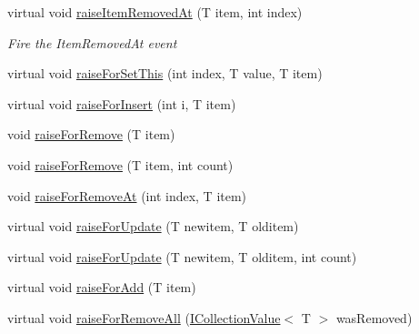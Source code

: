 \begin{DoxyCompactItemize}
virtual void \hyperlink{class_c5_1_1_collection_value_base_a510a21c57e543cadb4ce4748b9099679}{raise\+Item\+Removed\+At} (T item, int index)
\begin{DoxyCompactList}\small\item\em Fire the Item\+Removed\+At event \end{DoxyCompactList}\item 
virtual void \hyperlink{class_c5_1_1_collection_value_base_a14876a0f26a0741ff82f3d851caa4602}{raise\+For\+Set\+This} (int index, T value, T item)
\item 
virtual void \hyperlink{class_c5_1_1_collection_value_base_a1f7ef395f3ad8027a2b32916a181b418}{raise\+For\+Insert} (int i, T item)
\item 
void \hyperlink{class_c5_1_1_collection_value_base_a2e014b2904d9ef88d3e15f6b0997f71b}{raise\+For\+Remove} (T item)
\item 
void \hyperlink{class_c5_1_1_collection_value_base_a95fcc3b52892d362b6118f57a8906cb8}{raise\+For\+Remove} (T item, int count)
\item 
void \hyperlink{class_c5_1_1_collection_value_base_ae15fee0551df68fa0e163604f920d601}{raise\+For\+Remove\+At} (int index, T item)
\item 
virtual void \hyperlink{class_c5_1_1_collection_value_base_ad76dc5138c43e80dd057007d78bb374d}{raise\+For\+Update} (T newitem, T olditem)
\item 
virtual void \hyperlink{class_c5_1_1_collection_value_base_ad05d49b820265d7e4e73c4f5992596b9}{raise\+For\+Update} (T newitem, T olditem, int count)
\item 
virtual void \hyperlink{class_c5_1_1_collection_value_base_a1048affd98d865d07454bcea754ec049}{raise\+For\+Add} (T item)
\item 
virtual void \hyperlink{class_c5_1_1_collection_value_base_a527018f12c5e83a0c99ea8c3ec4ac6ca}{raise\+For\+Remove\+All} (\hyperlink{interface_c5_1_1_i_collection_value}{I\+Collection\+Value}$<$ T $>$ was\+Removed)
\end{DoxyCompactItemize}
